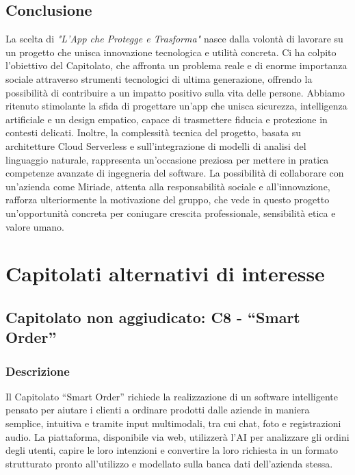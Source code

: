 \documentclass[a4paper,12pt]{article}
\begin{document}
\subsection{Conclusione}
La scelta di \textit{"L'App che Protegge e Trasforma"} nasce dalla volontà di lavorare su un progetto che unisca innovazione tecnologica e utilità concreta. Ci ha colpito l’obiettivo del Capitolato, che affronta un problema reale e di enorme importanza sociale attraverso strumenti tecnologici di ultima generazione, offrendo la possibilità di contribuire a un impatto positivo sulla vita delle persone. Abbiamo ritenuto stimolante la sfida di progettare un’app che unisca sicurezza, intelligenza artificiale e un design empatico, capace di trasmettere fiducia e protezione in contesti delicati. Inoltre, la complessità tecnica del progetto, basata su architetture Cloud Serverless e sull’integrazione di modelli di analisi del linguaggio naturale, rappresenta un’occasione preziosa per mettere in pratica competenze avanzate di ingegneria del software. La possibilità di collaborare con un’azienda come Miriade, attenta alla responsabilità sociale e all’innovazione, rafforza ulteriormente la motivazione del gruppo, che vede in questo progetto un’opportunità concreta per coniugare crescita professionale, sensibilità etica e valore umano. 

\section{Capitolati alternativi di interesse}

\subsection{Capitolato non aggiudicato: C8 - ``Smart Order''}

\subsubsection{Descrizione}
Il Capitolato ``Smart Order'' richiede la realizzazione di un software intelligente pensato per aiutare i clienti a ordinare prodotti dalle aziende in maniera semplice, intuitiva e tramite input multimodali, tra cui chat, foto e registrazioni audio. La piattaforma, disponibile via web, utilizzerà l’AI per analizzare gli ordini degli utenti, capire le loro intenzioni e convertire la loro richiesta in un formato strutturato pronto all’utilizzo e modellato sulla banca dati dell’azienda stessa.
\end{document}
